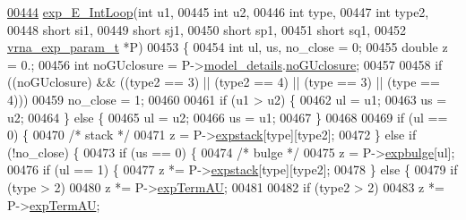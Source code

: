 \begin{DoxyCode}
\mbox{\hyperlink{group__loops_ga95de54d8a2a17645a95e0f34e189d9c9}{00444}} \mbox{\hyperlink{group__loops_ga95de54d8a2a17645a95e0f34e189d9c9}{exp\_E\_IntLoop}}(\textcolor{keywordtype}{int}               u1,
00445               \textcolor{keywordtype}{int}               u2,
00446               \textcolor{keywordtype}{int}               type,
00447               \textcolor{keywordtype}{int}               type2,
00448               \textcolor{keywordtype}{short}             si1,
00449               \textcolor{keywordtype}{short}             sj1,
00450               \textcolor{keywordtype}{short}             sp1,
00451               \textcolor{keywordtype}{short}             sq1,
00452               \mbox{\hyperlink{group__energy__parameters_structvrna__exp__param__s}{vrna\_exp\_param\_t}}  *P)
00453 \{
00454   \textcolor{keywordtype}{int}     ul, us, no\_close = 0;
00455   \textcolor{keywordtype}{double}  z           = 0.;
00456   \textcolor{keywordtype}{int}     noGUclosure = P->\mbox{\hyperlink{group__energy__parameters_ac18055127bccc27c1223f1d2f3b01b53}{model\_details}}.\mbox{\hyperlink{group__model__details_a7e883db1f33f8f3baa5c9b140350c78e}{noGUclosure}};
00457 
00458   \textcolor{keywordflow}{if} ((noGUclosure) && ((type2 == 3) || (type2 == 4) || (type == 3) || (type == 4)))
00459     no\_close = 1;
00460 
00461   \textcolor{keywordflow}{if} (u1 > u2) \{
00462     ul  = u1;
00463     us  = u2;
00464   \} \textcolor{keywordflow}{else} \{
00465     ul  = u2;
00466     us  = u1;
00467   \}
00468 
00469   \textcolor{keywordflow}{if} (ul == 0) \{
00470     \textcolor{comment}{/* stack */}
00471     z = P->\mbox{\hyperlink{group__energy__parameters_a0b288e466e25d1c4f45d138236b5a544}{expstack}}[type][type2];
00472   \} \textcolor{keywordflow}{else} \textcolor{keywordflow}{if} (!no\_close) \{
00473     \textcolor{keywordflow}{if} (us == 0) \{
00474       \textcolor{comment}{/* bulge */}
00475       z = P->\mbox{\hyperlink{group__energy__parameters_a7f2f16246bbfc5b009e4c34113dcacd7}{expbulge}}[ul];
00476       \textcolor{keywordflow}{if} (ul == 1) \{
00477         z *= P->\mbox{\hyperlink{group__energy__parameters_a0b288e466e25d1c4f45d138236b5a544}{expstack}}[type][type2];
00478       \} \textcolor{keywordflow}{else} \{
00479         \textcolor{keywordflow}{if} (type > 2)
00480           z *= P->\mbox{\hyperlink{group__energy__parameters_a9040df20dfcfeabaef375edb88a15326}{expTermAU}};
00481 
00482         \textcolor{keywordflow}{if} (type2 > 2)
00483           z *= P->\mbox{\hyperlink{group__energy__parameters_a9040df20dfcfeabaef375edb88a15326}{expTermAU}};

\end{DoxyCode}

